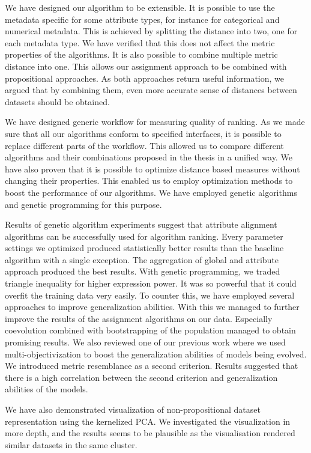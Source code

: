 We have designed our algorithm to be extensible. It is possible to use the metadata specific for some attribute types, for instance for categorical and numerical metadata. This is achieved by splitting the distance into two, one for each metadata type. We have verified that this does not affect the metric properties of the algorithms. It is also possible to combine multiple metric distance into one. This allows our assignment approach to be combined with propositional approaches. As both approaches return useful information, we argued that by combining them, even more accurate sense of distances between datasets should be obtained.

We have designed generic workflow for measuring quality of ranking. As we made sure that all our algorithms conform to specified interfaces, it is possible to replace different parts of the workflow. This allowed us to compare different algorithms and their combinations proposed in the thesis in a unified way. We have also proven that it is possible to optimize distance based measures without changing their properties. This enabled us to employ optimization methods to boost the performance of our algorithms. We have employed genetic algorithms and genetic programming for this purpose. 

Results of genetic algorithm experiments suggest that attribute alignment algorithms can be successfully used for algorithm ranking. Every parameter settings we optimized produced statistically better results than the baseline algorithm with a single exception. The aggregation of global and attribute approach produced the best results.
With genetic programming, we traded triangle inequality for higher expression power. It was so powerful that it could overfit the training data very easily. To counter this, we have employed several approaches to improve generalization abilities. With this we managed to further improve the results of the assignment algorithms on our data. Especially coevolution combined with bootstrapping of the population managed to obtain promising results. We also reviewed one of our previous work where we used multi-objectivization to boost the generalization abilities of models being evolved. We introduced metric resemblance as a second criterion. Results suggested that there is a high correlation between the second criterion and generalization abilities of the models.

We have also demonstrated visualization of non-propositional dataset representation using the kernelized PCA. We investigated the visualization in more depth, and the results seems to be plausible as the visualisation rendered similar datasets in the same cluster.

